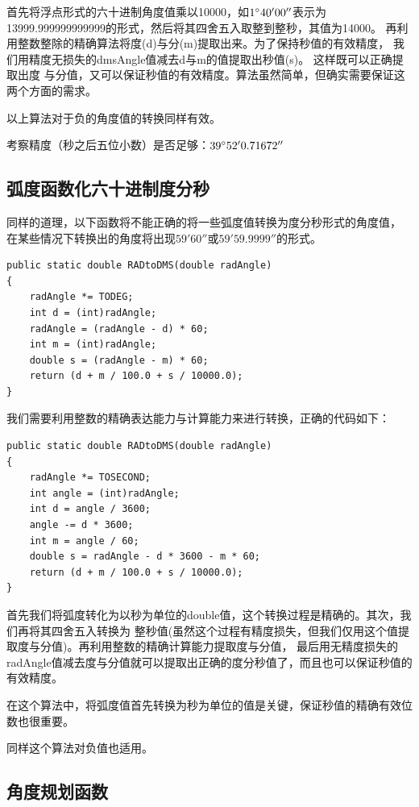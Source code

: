 首先将浮点形式的六十进制角度值乘以10000，如$1^\circ 40'00''$表示为
13999.999999999999的形式，然后将其四舍五入取整到整秒，其值为14000。
再利用整数整除的精确算法将度(d)与分(m)提取出来。为了保持秒值的有效精度，
我们用精度无损失的dmsAngle值减去d与m的值提取出秒值(s)。 这样既可以正确提取出度
与分值，又可以保证秒值的有效精度。算法虽然简单，但确实需要保证这两个方面的需求。

 以上算法对于负的角度值的转换同样有效。

 考察精度（秒之后五位小数）是否足够：$39^\circ 52'0.71672''$


\subsection{弧度函数化六十进制度分秒}

同样的道理，以下函数将不能正确的将一些弧度值转换为度分秒形式的角度值，
在某些情况下转换出的角度将出现$59'60''$或$59'59.9999''$的形式。

\begin{lstlisting}
public static double RADtoDMS(double radAngle)
{
    radAngle *= TODEG;
    int d = (int)radAngle;
    radAngle = (radAngle - d) * 60;
    int m = (int)radAngle;
    double s = (radAngle - m) * 60;
    return (d + m / 100.0 + s / 10000.0);
}
\end{lstlisting}

我们需要利用整数的精确表达能力与计算能力来进行转换，正确的代码如下：

\begin{lstlisting}
public static double RADtoDMS(double radAngle)
{
    radAngle *= TOSECOND;
    int angle = (int)radAngle; 
    int d = angle / 3600;
    angle -= d * 3600;
    int m = angle / 60;
    double s = radAngle - d * 3600 - m * 60;
    return (d + m / 100.0 + s / 10000.0);
}
\end{lstlisting}

首先我们将弧度转化为以秒为单位的double值，这个转换过程是精确的。其次，我们再将其四舍五入转换为
整秒值(虽然这个过程有精度损失，但我们仅用这个值提取度与分值)。再利用整数的精确计算能力提取度与分值，
最后用无精度损失的radAngle值减去度与分值就可以提取出正确的度分秒值了，而且也可以保证秒值的有效精度。

在这个算法中，将弧度值首先转换为秒为单位的值是关键，保证秒值的精确有效位数也很重要。

同样这个算法对负值也适用。

\subsection{角度规划函数}

